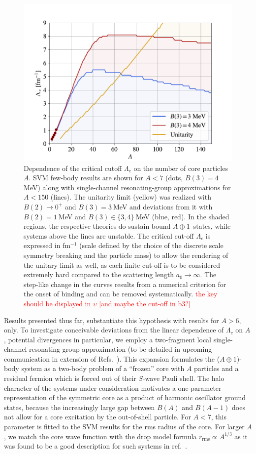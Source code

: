 \documentclass[preprint,12pt]{elsarticle}
\newcommand{\lc}{\ensuremath{\Lambda_c}}
\newcommand{\abb}{\mbox{\ensuremath{A\oplus 1}}}
\newcommand{\red}[1]{\textcolor{red}{#1}}
\begin{document}
\begin{figure}
\centering
\includegraphics[width=\linewidth]{./RGM.pdf} 
\caption{Dependence of the critical cutoff $\lc$ on the number of core particles
$A$. SVM few-body results are shown for $A<7$ (dots, $B(3)=4~$MeV) along with single-channel resonating-group approximations for $A<150$ (lines). The unitarity limit
(yellow) was realized with $B(2)\to0^+$ and $B(3)=3~$MeV and deviations from it
with $B(2)=1~$MeV and $B(3)\in\lbrace3,4\rbrace~$MeV (blue, red). 
In the shaded regions, the respective theories do sustain bound \abb~states,
while systems above the lines are unstable.
The critical cut-off $\Lambda_c$ is expressed in fm$^{-1}$ (scale defined by the choice of the discrete scale symmetry breaking and the particle mass) to allow the rendering of the unitary limit as well, as each finite cut-off is to be considered extremely hard compared to the scattering length $a_0\rightarrow\infty$.
The step-like change in the curves results from a numerical criterion for the onset of binding and
can be removed systematically. 
\red{the key should be displayed in $\upsilon$ [and maybe the cut-off in b3?]}}
\label{fig:RGM}
\end{figure}


Results presented thus far, substantiate this hypothesis with results for $A>6$, only. To investigate conceivable deviations from
the linear dependence of $\lc$ on $A$, potential divergences in particular, we employ a two-fragment
local single-channel resonating-group approximation
(to be detailed in upcoming communication in extension of Refs.~\cite{PhysRev.52.1083,Naidon_2016}). 
This expansion formulates the (\abb)-body system as a two-body problem of a ``frozen'' core with $A$ particles and a residual
fermion which is forced out of their $S$-wave Pauli shell.
The halo character of the systems under consideration motivates a one-parameter representation of the symmetric core as a product of harmonic oscillator ground states, because the increasingly large gap between $B(A)$ and $B(A-1)$ does not allow for a core excitation
by the out-of-shell particle.
For $A<7$, this parameter is fitted to the SVM results for the rms radius of the core.
For larger $A$, we match the core wave function with the drop model formula $r_\text{rms}\propto A^{1/3}$ as 
it was found to be a good description for such systems in ref.~\cite{manybosons}.
\end{document}
